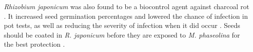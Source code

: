 \documentclass[letterpaper, 12pt]{report}
\begin{document}
\emph{Rhizobium japonicum} was also found to be a biocontrol agent against charcoal rot \autocite{al2012rhizobium}. It increased seed germination percentages and lowered the chance of infection in pot tests, as well as reducing the severity of infection when it did occur \autocite{al2012rhizobium}. Seeds should be coated in \emph{R. japonicum} before they are exposed to \emph{M. phaseolina} for the best protection \autocite{al2012rhizobium}.


\newpage

\thispagestyle{fancy}
\printbibliography[title=References]
\end{document}
